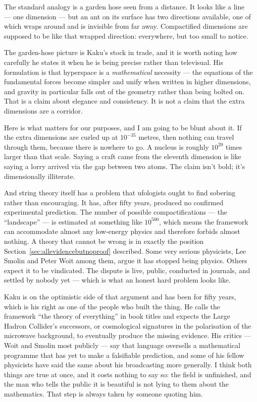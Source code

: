 The standard analogy is a garden hose seen from a distance. It looks like a line --- one
dimension --- but an ant on its surface has two directions available, one of which wraps around
and is invisible from far away. Compactified dimensions are supposed to be like that wrapped
direction: everywhere, but too small to notice.

The garden-hose picture is Kaku's stock in trade, and it is worth noting how carefully he states
it when he is being precise rather than televisual. His formulation is that hyperspace is a
\emph{mathematical} necessity --- the equations of the fundamental forces become simpler and unify
when written in higher dimensions, and gravity in particular falls out of the geometry rather than
being bolted on. That is a claim about elegance and consistency. It is not a claim that the extra
dimensions are a corridor. 

Here is what matters for our purposes, and I am going to be blunt about it. If the extra
dimensions are curled up at $10^{-35}$ metres, then nothing can travel through them, because
there is nowhere to go. A nucleus is roughly $10^{20}$ times larger than that scale. Saying a
craft came from the eleventh dimension is like saying a lorry arrived via the gap between two
atoms. The claim isn't bold; it's dimensionally illiterate.

And string theory itself has a problem that ufologists ought to find sobering rather than
encouraging. It has, after fifty years, produced no confirmed experimental prediction. The
number of possible compactifications --- the ``landscape'' --- is estimated at something like
$10^{500}$, which means the framework can accommodate almost any low-energy physics and
therefore forbids almost nothing. A theory that cannot be wrong is in exactly the position
Section~\ref{sec:allevidencebutnoproof} described. Some very serious physicists, Lee Smolin and Peter Woit among them, argue
it has stopped being physics. Others expect it to be vindicated. The dispute is live, public,
conducted in journals, and settled by nobody yet --- which is what an honest hard problem looks
like.

Kaku is on the optimistic side of that argument and has been for fifty years, which is his right
as one of the people who built the thing. He calls the framework ``the theory of everything'' in
book titles and expects the Large Hadron Collider's successors, or cosmological signatures in the
polarisation of the microwave background, to eventually produce the missing evidence. His critics
--- Woit and Smolin most publicly --- say that language oversells a mathematical programme that has
yet to make a falsifiable prediction, and some of his fellow physicists have said the same about
his broadcasting more generally. I think both things are true at once, and it costs nothing to
say so: the field is unfinished, and the man who tells the public it is beautiful is not lying to
them about the mathematics.  That step is always taken
by someone quoting him.

